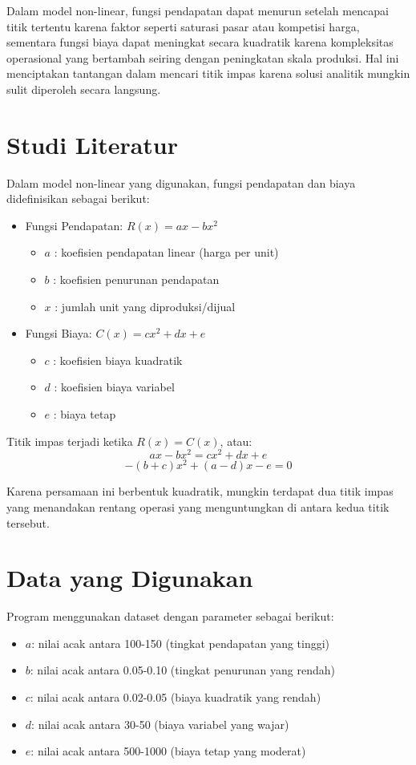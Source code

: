 \documentclass[conference]{IEEEtran}
\begin{document}
Dalam model non-linear, fungsi pendapatan dapat menurun setelah mencapai titik tertentu karena faktor seperti saturasi pasar atau kompetisi harga, sementara fungsi biaya dapat meningkat secara kuadratik karena kompleksitas operasional yang bertambah seiring dengan peningkatan skala produksi. Hal ini menciptakan tantangan dalam mencari titik impas karena solusi analitik mungkin sulit diperoleh secara langsung.

\section{Studi Literatur}
Dalam model non-linear yang digunakan, fungsi pendapatan dan biaya didefinisikan sebagai berikut:

\begin{itemize}
\item Fungsi Pendapatan: $R(x) = ax - bx^2$
\begin{itemize}
\item $a$ : koefisien pendapatan linear (harga per unit)
\item $b$ : koefisien penurunan pendapatan
\item $x$ : jumlah unit yang diproduksi/dijual
\end{itemize}

\item Fungsi Biaya: $C(x) = cx^2 + dx + e$
\begin{itemize}
\item $c$ : koefisien biaya kuadratik
\item $d$ : koefisien biaya variabel
\item $e$ : biaya tetap
\end{itemize}
\end{itemize}

Titik impas terjadi ketika $R(x) = C(x)$, atau:
\[ax - bx^2 = cx^2 + dx + e\]
\[-(b+c)x^2 + (a-d)x - e = 0\]

Karena persamaan ini berbentuk kuadratik, mungkin terdapat dua titik impas yang menandakan rentang operasi yang menguntungkan di antara kedua titik tersebut.

\section{Data yang Digunakan}
Program menggunakan dataset dengan parameter sebagai berikut:
\begin{itemize}
\item $a$: nilai acak antara 100-150 (tingkat pendapatan yang tinggi)
\item $b$: nilai acak antara 0.05-0.10 (tingkat penurunan yang rendah)
\item $c$: nilai acak antara 0.02-0.05 (biaya kuadratik yang rendah)
\item $d$: nilai acak antara 30-50 (biaya variabel yang wajar)
\item $e$: nilai acak antara 500-1000 (biaya tetap yang moderat)
\end{itemize}
\end{document}
